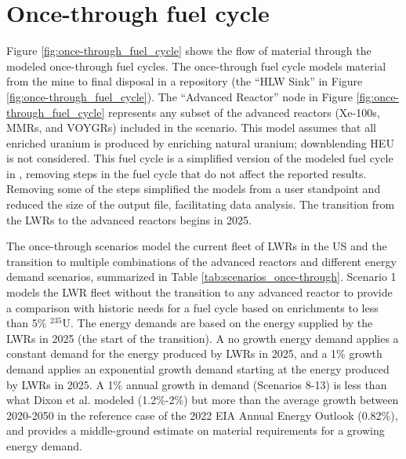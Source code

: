 \section{Once-through fuel cycle}
Figure \ref{fig:once-through_fuel_cycle} shows the flow of material through 
the modeled once-through fuel cycles. The once-through fuel cycle models 
material from the mine to final disposal in a repository (the 
``HLW Sink'' in Figure \ref{fig:once-through_fuel_cycle}). The 
``Advanced Reactor'' node in Figure 
\ref{fig:once-through_fuel_cycle} represents any subset of the advanced 
reactors (Xe-100s, \glspl{MMR}, and VOYGRs) included 
in the scenario. This model assumes that all enriched uranium is produced 
by enriching natural uranium; downblending \gls{HEU} is not considered. 
This fuel cycle is a simplified version of the modeled fuel cycle in 
\cite{bachmann_enrichment_2021}, removing steps in the fuel cycle that 
do not affect the reported results. Removing some of the steps simplified 
the models from a user standpoint and reduced the size of the \Cyclus 
output file, facilitating data analysis. The transition from the 
\glspl{LWR} to the advanced reactors begins in 2025. 



The once-through scenarios model the current fleet of \glspl{LWR} in the 
US and the transition to multiple 
combinations of the advanced reactors and different energy demand scenarios, 
summarized in Table \ref{tab:scenarios_once-through}. Scenario 1 models
the \gls{LWR} fleet without the transition to any advanced reactor to 
provide 
a comparison with historic needs for a fuel cycle 
based on enrichments to less than 5\% $^{235}$U. The energy demands are 
based on the energy supplied by the \glspl{LWR} in 2025 (the start of 
the transition). A no growth energy demand applies a constant demand for 
the energy produced by \glspl{LWR} in 2025, and a 1\% growth demand applies 
an exponential growth demand starting at the energy produced by 
\glspl{LWR} in 2025. A 1\% annual growth in 
demand (Scenarios 8-13) is less than what Dixon et al. \cite{dixon_estimated_2022} 
modeled
(1.2\%-2\%) but more than the average growth between 2020-2050 in the 
reference case of the 2022 \gls{EIA} Annual Energy Outlook 
\cite{energy_information_administration_annual_2022} (0.82\%), and 
provides a middle-ground estimate on material requirements for a growing 
energy demand. 

